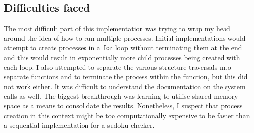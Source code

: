 \documentclass[parallelismlabreport.tex]{subfiles}
\begin{document}
\subsection{Difficulties faced}
The most difficult part of this implementation was trying to wrap my head around the idea of how to run multiple processes. Initial implementations would attempt to create processes in a \verb|for| loop without terminating them at the end and this would result in exponentially more child processes being created with each loop. I also attempted to separate the various structure traversals into separate functions and to terminate the process within the function, but this did not work either. It was difficult to understand the documentation on the system calls as well. The biggest breakthrough was learning to utilise shared memory space as a means to consolidate the results. Nonetheless, I suspect that process creation in this context might be too computationally expensive to be faster than a sequential implementation for a sudoku checker.
\end{document}
